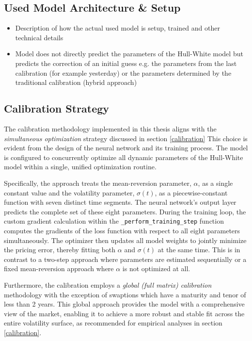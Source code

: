 {\subsection{Used Model Architecture \& Setup}
\begin{itemize}
	\item Description of how the actual used model is setup, trained and other technical details
	\item Model does not directly predict the parameters of the Hull-White model but predicts the correction of an initial guess e.g. the parameters from the last calibration (for example yesterday) or the parameters determined by the traditional calibration (hybrid approach)
\end{itemize}

\subsection{Calibration Strategy}
The calibration methodology implemented in this thesis aligns with the \textit{simultaneous optimization} strategy discussed in section \ref{calibration} This choice is evident from the design of the neural network and its training process. The model is configured to concurrently optimize all dynamic parameters of the Hull-White model within a single, unified optimization routine.

Specifically, the approach treats the mean-reversion parameter, $\alpha$, as a single constant value and the volatility parameter, $\sigma(t)$, as a piecewise-constant function with seven distinct time segments. The neural network's output layer predicts the complete set of these eight parameters. During the training loop, the custom gradient calculation within the \texttt{\_perform\_training\_step} function computes the gradients of the loss function with respect to all eight parameters simultaneously. The optimizer then updates all model weights to jointly minimize the pricing error, thereby fitting both $\alpha$ and $\sigma(t)$ at the same time. This is in contrast to a two-step approach where parameters are estimated sequentially or a fixed mean-reversion approach where $\alpha$ is not optimized at all.

Furthermore, the calibration employs a \textit{global (full matrix) calibration} methodology with the exception of swaptions which have a maturity and tenor of less than 2 years. This global approach provides the model with a comprehensive view of the market, enabling it to achieve a more robust and stable fit across the entire volatility surface, as recommended for empirical analyses in section \ref{calibration}.

}
